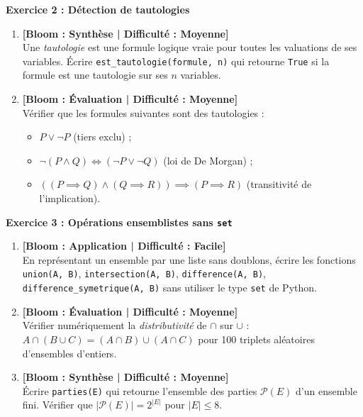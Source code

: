 \noindent\textbf{Exercice 2 : Détection de tautologies}
\begin{enumerate}
    \item \textbf{[Bloom : Synthèse | Difficulté : Moyenne]} \\
    Une \emph{tautologie} est une formule logique vraie pour toutes les valuations de ses variables. Écrire \texttt{est\_tautologie(formule, n)} qui retourne \texttt{True} si la formule est une tautologie sur ses $n$ variables.
    \item \textbf{[Bloom : Évaluation | Difficulté : Moyenne]} \\
    Vérifier que les formules suivantes sont des tautologies :
    \begin{itemize}
        \item $P \lor \neg P$ (tiers exclu) ;
        \item $\neg(P \land Q) \iff (\neg P \lor \neg Q)$ (loi de De Morgan) ;
        \item $((P \implies Q) \land (Q \implies R)) \implies (P \implies R)$ (transitivité de l'implication).
    \end{itemize}
\end{enumerate}

\vspace{0.3cm}

\noindent\textbf{Exercice 3 : Opérations ensemblistes sans \texttt{set}}
\begin{enumerate}
    \item \textbf{[Bloom : Application | Difficulté : Facile]} \\
    En représentant un ensemble par une liste sans doublons, écrire les fonctions \texttt{union(A, B)}, \texttt{intersection(A, B)}, \texttt{difference(A, B)}, \texttt{difference\_symetrique(A, B)} sans utiliser le type \texttt{set} de Python.
    \item \textbf{[Bloom : Évaluation | Difficulté : Moyenne]} \\
    Vérifier numériquement la \emph{distributivité} de $\cap$ sur $\cup$ : $A \cap (B \cup C) = (A \cap B) \cup (A \cap C)$ pour 100 triplets aléatoires d'ensembles d'entiers.
    \item \textbf{[Bloom : Synthèse | Difficulté : Moyenne]} \\
    Écrire \texttt{parties(E)} qui retourne l'ensemble des parties $\mathcal{P}(E)$ d'un ensemble fini. Vérifier que $|\mathcal{P}(E)| = 2^{|E|}$ pour $|E| \le 8$.
\end{enumerate}

